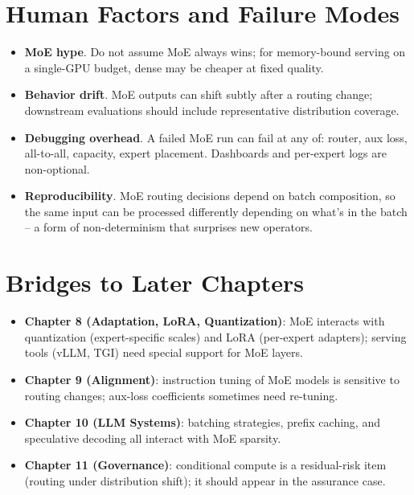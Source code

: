 \section{Human Factors and Failure Modes}

\begin{itemize}
  \item \textbf{MoE hype}. Do not assume MoE always wins; for
        memory-bound serving on a single-GPU budget, dense may be
        cheaper at fixed quality.
  \item \textbf{Behavior drift}. MoE outputs can shift subtly after
        a routing change; downstream evaluations should include
        representative distribution coverage.
  \item \textbf{Debugging overhead}. A failed MoE run can fail at any
        of: router, aux loss, all-to-all, capacity, expert placement.
        Dashboards and per-expert logs are non-optional.
  \item \textbf{Reproducibility}. MoE routing decisions depend on
        batch composition, so the same input can be processed
        differently depending on what's in the batch -- a form of
        non-determinism that surprises new operators.
\end{itemize}

\section{Bridges to Later Chapters}

\begin{itemize}
  \item \textbf{Chapter 8 (Adaptation, LoRA, Quantization)}: MoE
        interacts with quantization (expert-specific scales) and
        LoRA (per-expert adapters); serving tools (vLLM, TGI) need
        special support for MoE layers.
  \item \textbf{Chapter 9 (Alignment)}: instruction tuning of MoE models
        is sensitive to routing changes; aux-loss coefficients
        sometimes need re-tuning.
  \item \textbf{Chapter 10 (LLM Systems)}: batching strategies, prefix
        caching, and speculative decoding all interact with MoE
        sparsity.
  \item \textbf{Chapter 11 (Governance)}: conditional compute is a
        residual-risk item (routing under distribution shift); it
        should appear in the assurance case.
\end{itemize}

